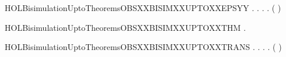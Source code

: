 \newcommand{\HOLBisimulationUptoTheoremsOBSXXBISIMXXUPTOXXEPS}{\UseVerbatim{HOLBisimulationUptoTheoremsOBSXXBISIMXXUPTOXXEPS}}
\begin{SaveVerbatim}{HOLBisimulationUptoTheoremsOBSXXBISIMXXUPTOXXEPSYY}
\HOLTokenTurnstile{} \HOLSymConst{\HOLTokenForall{}}.
         \HOLSymConst{\HOLTokenImp{}}
       \HOLSymConst{\HOLTokenForall{}} .
              \HOLSymConst{\HOLTokenImp{}}
           \HOLSymConst{\HOLTokenForall{}}.
                  \HOLSymConst{\HOLTokenImp{}}
               \HOLSymConst{\HOLTokenExists{}}.
                      \HOLSymConst{\HOLTokenConj{}}
                   (    )  
\end{SaveVerbatim}
\newcommand{\HOLBisimulationUptoTheoremsOBSXXBISIMXXUPTOXXEPSYY}{\UseVerbatim{HOLBisimulationUptoTheoremsOBSXXBISIMXXUPTOXXEPSYY}}
\begin{SaveVerbatim}{HOLBisimulationUptoTheoremsOBSXXBISIMXXUPTOXXTHM}
\HOLTokenTurnstile{} \HOLSymConst{\HOLTokenForall{}}.   \HOLSymConst{\HOLTokenImp{}}   
\end{SaveVerbatim}
\newcommand{\HOLBisimulationUptoTheoremsOBSXXBISIMXXUPTOXXTHM}{\UseVerbatim{HOLBisimulationUptoTheoremsOBSXXBISIMXXUPTOXXTHM}}
\begin{SaveVerbatim}{HOLBisimulationUptoTheoremsOBSXXBISIMXXUPTOXXTRANS}
\HOLTokenTurnstile{} \HOLSymConst{\HOLTokenForall{}}.
         \HOLSymConst{\HOLTokenImp{}}
       \HOLSymConst{\HOLTokenForall{}} .
              \HOLSymConst{\HOLTokenImp{}}
           \HOLSymConst{\HOLTokenForall{}} .
                \HOLTokenTransBegin{}\HOLTokenTransEnd {} \HOLSymConst{\HOLTokenImp{}}
               \HOLSymConst{\HOLTokenExists{}}.
                    \HOLTokenWeakTransBegin{}\HOLTokenWeakTransEnd {} \HOLSymConst{\HOLTokenConj{}}
                   (    )  
\end{SaveVerbatim}

